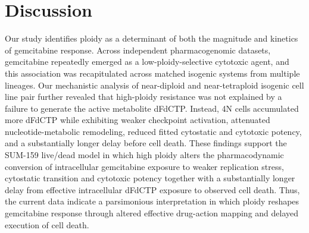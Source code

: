 \documentclass[11pt,notitlepage]{article}
\begin{document}
\section*{Discussion}



Our study identifies ploidy as a determinant of both the magnitude and kinetics of gemcitabine response. Across independent pharmacogenomic datasets, gemcitabine repeatedly emerged as a low-ploidy-selective cytotoxic agent, and this association was recapitulated across matched isogenic systems from multiple lineages. Our mechanistic analysis of near-diploid and near-tetraploid isogenic cell line pair further revealed that high-ploidy resistance was not explained by a failure to generate the active metabolite dFdCTP. Instead, 4N cells accumulated more dFdCTP while exhibiting weaker checkpoint activation, attenuated nucleotide-metabolic remodeling, reduced fitted cytostatic and cytotoxic potency, and a substantially longer delay before cell death. These findings support the SUM-159 live/dead model in which high ploidy alters the pharmacodynamic conversion of intracellular gemcitabine exposure to weaker replication stress, cytostatic transition and cytotoxic potency together with a substantially longer delay from effective intracellular dFdCTP exposure to observed cell death. Thus, the current data indicate a parsimonious interpretation in which ploidy reshapes gemcitabine response through altered effective drug-action mapping and delayed execution of cell death.
\end{document}
